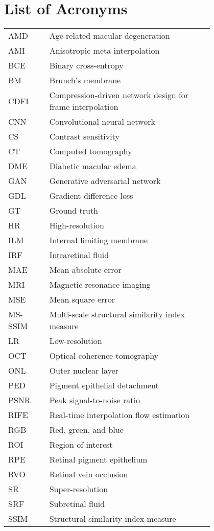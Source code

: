 \chapter*{List of Acronyms}

\begin{flushleft}
\begin{tabular}{l p{0.8\linewidth}}
	
AMD      & Age-related macular degeneration\\
AMI 	 & Anisotropic meta interpolation\\
BCE		 & Binary cross-entropy\\
BM   	 & Brunch's membrane\\
CDFI 	 & Compression-driven network design for frame interpolation\\
CNN      & Convolutional neural network\\
CS 		 & Contrast sensitivity\\
CT 		 & Computed tomography\\
DME      & Diabetic macular edema\\
GAN 	 & Generative adversarial network\\
GDL 	 & Gradient difference loss\\
GT  	 & Ground truth\\
HR 		 & High-resolution\\
ILM 	 & Internal limiting membrane\\
IRF      & Intraretinal fluid\\
MAE 	 & Mean absolute error\\
MRI 	 & Magnetic resonance imaging\\
MSE		 & Mean square error\\	
MS-SSIM  & Multi-scale structural similarity index measure\\
LR 		 & Low-resolution\\
OCT      & Optical coherence tomography\\
ONL      & Outer nuclear layer\\
PED      & Pigment epithelial detachment\\
PSNR 	 & Peak signal-to-noise ratio\\
RIFE	 & Real-time interpolation flow estimation\\
RGB 	 & Red, green, and blue\\
ROI		 & Region of interest\\
RPE      & Retinal pigment epithelium\\
RVO 	 & Retinal vein occlusion\\
SR		 & Super-resolution\\
SRF      & Subretinal fluid\\
SSIM 	 & Structural similarity index measure\\

\end{tabular}
\end{flushleft}

